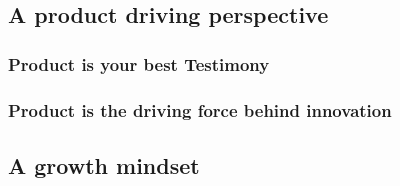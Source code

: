 \documentclass[aspectratio=169,xcolor=x11names,table]{beamer}
\begin{document}
\subsection{A product driving perspective}

\begin{frame}
	\frametitle{Product is your best Testimony}
\end{frame}

\begin{frame}
	\frametitle{Product is the driving force behind innovation}
\end{frame}


\subsection{A growth mindset}
\end{document}
